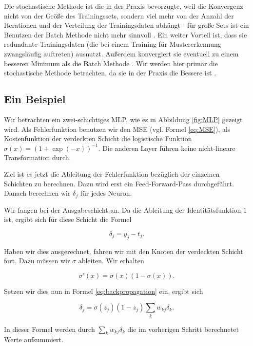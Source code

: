 Die stochastische Methode ist die in der Praxis bevorzugte, weil die Konvergenz nicht von der Größe des Trainingssets, sondern viel mehr von der Anzahl der Iterationen und der Verteilung der Trainingsdaten abhängt - für große Sets ist ein Benutzen der Batch Methode nicht mehr sinnvoll \cite{bengio2012practical}.
Ein weiter Vorteil ist, dass sie redundante Trainingsdaten (die bei einem Training für Mustererkennung zwangsläufig auftreten) ausnutzt. Außerdem konvergiert sie eventuell zu einem besseren Minimum als die Batch Methode \cite{lecunefficient}.
Wir werden hier primär die stochastische Methode betrachten, da sie in der Praxis die Bessere ist \cite{lecunefficient, bengio2012practical}.

\subsection{Ein Beispiel}
Wir betrachten ein zwei-schichtiges MLP, wie es in Abbildung \ref{fig:MLP} gezeigt wird. 
Als Fehlerfunktion benutzen wir den MSE (vgl. Formel \ref{eq:MSE}), als Kostenfunktion der verdeckten Schicht die logistische Funktion $\sigma(x) = (1 + \exp(-x))^{-1}$. Die anderen Layer führen keine nicht-lineare Transformation durch.

Ziel ist es jetzt die Ableitung der Fehlerfunktion bezüglich der einzelnen Schichten zu berechnen. Dazu wird erst ein Feed-Forward-Pass durchgeführt. Danach berechnen wir $\delta_j$ für jedes Neuron. 

Wir fangen bei der Ausgabeschicht an. Da die Ableitung der Identitätsfunktion $1$ ist, ergibt sich für diese Schicht die Formel

\begin{equation}
  \delta_j = y_j - t_j.
\end{equation}

Haben wir dies ausgerechnet, fahren wir mit den Knoten der verdeckten Schicht fort. Dazu müssen wir $\sigma$ ableiten. Wir erhalten

\begin{equation}
  \sigma'(x) = \sigma(x) (1 - \sigma(x)). 
\end{equation}

Setzen wir dies nun in Formel \ref{eq:backpropagation} ein, ergibt sich %

\begin{equation}
  \delta_j = \sigma(z_j) (1-z_j) \sum_k w_{kj} \delta_k.
\end{equation}

In dieser Formel werden durch $\sum_k w_{kj} \delta_k$ die im vorherigen Schritt berechnetet Werte aufsummiert.


